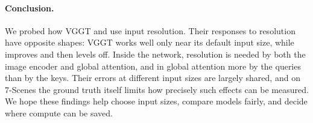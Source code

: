 \paragraph{Conclusion.}
We probed how VGGT and \pithree use input resolution. Their responses to resolution have opposite shapes: VGGT works well only near its default input size, while \pithree improves and then levels off. Inside the network, resolution is needed by both the image encoder and global attention, and in global attention more by the queries than by the keys. Their errors at different input sizes are largely shared, and on 7-Scenes the ground truth itself limits how precisely such effects can be measured. We hope these findings help choose input sizes, compare models fairly, and decide where compute can be saved.
